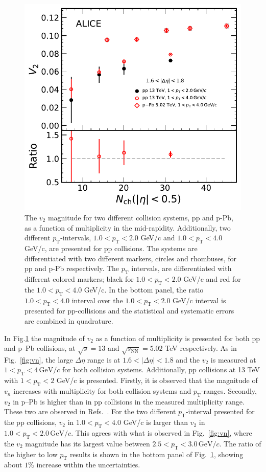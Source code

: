 \begin{figure}[h!]
	\centering
	\includegraphics[width=0.55 \textwidth]{figures/Fig6_v2Mult_allSystemsComp2.pdf} 
	\caption{The $v_2$ magnitude for two different collision systems, pp and p-Pb, as a function of multiplicity in the mid-rapidity. Additionally, two different $p_\mathrm{T}$-intervals, $1.0<p_\mathrm{T}<2.0$ GeV/c and $1.0<p_\mathrm{T}<4.0$ GeV/c, are presented for pp collisions. The systems are differentiated with two different markers, circles and rhombuses, for pp and p-Pb respectively. The $p_\mathrm{T}$ intervals, are differentiated with different colored markers; black for $1.0<p_\mathrm{T}<2.0$ GeV/c and red for the $1.0<p_\mathrm{T}<4.0$ GeV/c. In the bottom panel, the ratio $1.0<p_\mathrm{T}<4.0$ interval over the $1.0<p_\mathrm{T}<2.0$ GeV/c interval is presented for pp-collisions and the statistical and systematic errors are combined in quadrature.} 
	\label{fig:v2mult}
\end{figure}

In Fig.\ref{fig:v2mult} the magnitude of $v_2$ as a function of multiplicity is presented for both pp and p--Pb collisions, at $\sqrt{s}=13$ and $\sqrt{s_\mathrm{NN}}=5.02$ TeV respectively. As in Fig.~\ref{fig:vn}, the large $\Delta\eta$ range is at $1.6<|\Delta\eta|<1.8$ and the $v_2$ is measured at $1<p_{\mathrm{T}}<4\,\mathrm{GeV}/c$ for both collision systems. Additionally, pp collisions at 13 TeV with $1<p_{\mathrm{T}}<2$ GeV/c is presented. Firstly, it is observed that the magnitude of $v_n$ increases with multiplicity for both collision systems and $p_\mathrm{T}$-ranges. Secondly, $v_2$ in p--Pb is higher than in pp collisions in the measured multiplicity range. These two are observed in Refs.~\cite{ATLAS:2015hzw,ATLAS:2016yzd, Khachatryan:2015lva}. 
For the two different $p_\mathrm{T}$-interval presented for the pp collisions, $v_2$ in $1.0<p_\mathrm{T}<4.0$ GeV/c is larger than $v_2$ in $1.0<p_\mathrm{T}<2.0\,\mathrm{GeV}/c$. This agrees with what is observed in Fig.~\ref{fig:vn}, where the $v_2$ magnitude has its largest value between $2.5<p_\mathrm{T}<3.0\,\mathrm{GeV}/c$. The ratio of the higher to low $p_\mathrm{T}$ results is shown in the bottom panel of Fig.~\ref{fig:v2mult}, showing about $1\%$ increase within the uncertainties.


